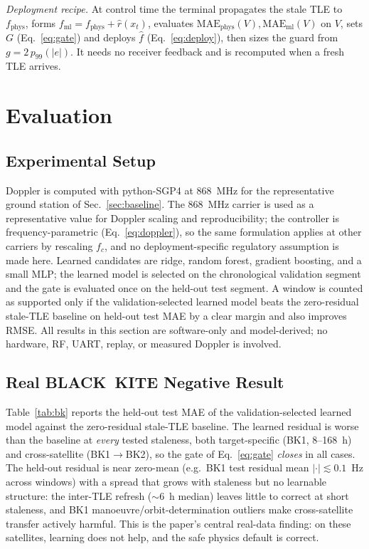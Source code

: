 \documentclass[conference]{IEEEtran}
\begin{document}
\emph{Deployment recipe.} At control time the terminal propagates the stale TLE to
$f_{\mathrm{phys}}$, forms $f_{\mathrm{ml}}=f_{\mathrm{phys}}+\hat r(x_t)$,
evaluates $\mathrm{MAE}_{\mathrm{phys}}(V),\mathrm{MAE}_{\mathrm{ml}}(V)$ on $V$,
sets $G$ (Eq.~\eqref{eq:gate}) and deploys $\hat f$ (Eq.~\eqref{eq:deploy}), then
sizes the guard from $g=2\,p_{99}(|e|)$. It needs no receiver feedback and is
recomputed when a fresh TLE arrives.

\section{Evaluation}
\label{sec:eval}

\subsection{Experimental Setup}
Doppler is computed with python-SGP4 at 868~MHz for the representative ground
station of Sec.~\ref{sec:baseline}. The 868~MHz carrier is used as a
representative value for Doppler scaling and reproducibility; the controller is
frequency-parametric (Eq.~\eqref{eq:doppler}), so the same formulation applies at
other carriers by rescaling $f_c$, and no deployment-specific regulatory
assumption is made here. Learned candidates are ridge, random forest,
gradient boosting, and a small MLP; the learned model is selected on the
chronological validation segment and the gate is evaluated once on the held-out
test segment. A window is counted as supported only if the validation-selected
learned model beats the zero-residual stale-TLE baseline on held-out test MAE by
a clear margin and also improves RMSE. All results in this section are
software-only and model-derived; no hardware, RF, UART, replay, or measured
Doppler is involved.

\subsection{Real BLACK~KITE Negative Result}
\label{sec:eval-real}
Table~\ref{tab:bk} reports the held-out test MAE of the validation-selected
learned model against the zero-residual stale-TLE baseline. The learned residual
is worse than the baseline at \emph{every} tested staleness, both target-specific
(BK1, 8--168~h) and cross-satellite (BK1$\rightarrow$BK2), so the gate of
Eq.~\eqref{eq:gate} \emph{closes} in all cases. The held-out residual is
near zero-mean (e.g.\ BK1 test residual mean $|{\cdot}|\!\lesssim\!0.1$~Hz across
windows) with a spread that grows with staleness but no learnable structure: the
inter-TLE refresh ($\sim$6~h median) leaves little to correct at short staleness,
and BK1 manoeuvre/orbit-determination outliers make cross-satellite transfer
actively harmful. This is the paper's central real-data finding: on these
satellites, learning does not help, and the safe physics default is correct.
\end{document}
